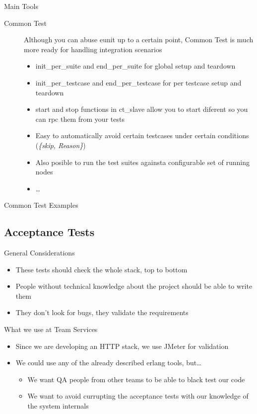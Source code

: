 \documentclass[pdf]{beamer}
\begin{document}
\begin{frame}{Main Tools}
    \begin{description}
    \item [Common Test] Although you can abuse eunit up to a certain point, Common Test is much more ready for handling
    integration scenarios
        \begin{itemize}
        \item init\_per\_suite and end\_per\_suite for global setup and teardown
        \item init\_per\_testcase and end\_per\_testcase for per testcase setup and teardown
        \item start and stop functions in ct\_slave allow you to start diferent so you can rpc them from your tests
        \item Easy to automatically avoid certain testcases under certain conditions (\emph{\{skip, Reason\}})
        \item Also posible to run the test suites againsta configurable set of running nodes
        \item \dots
        \end{itemize}
    \end{description}
\end{frame}

\begin{frame}{Common Test Examples}
\end{frame}

\subsection*{Acceptance Tests}
\label{acceptance_tests}

\begin{frame}{General Considerations}
    \begin{itemize}
    \item These tests should check the whole stack, top to bottom
    \item People without technical knowledge about the project should be able to write them
    \item They don't look for bugs, they validate the requirements
    \end{itemize}
\end{frame}

\begin{frame}{What we use at Team Services}
    \begin{itemize}
    \item Since we are developing an HTTP stack, we use JMeter for validation
    \item We could use any of the already described erlang tools, but\dots
    \pause
        \begin{itemize}
        \item We want QA people from other teams to be able to black test our code
        \item We want to avoid currupting the acceptance tests with our knowledge of the system internals
        \end{itemize}
    \end{itemize}
\end{frame}
\end{document}
